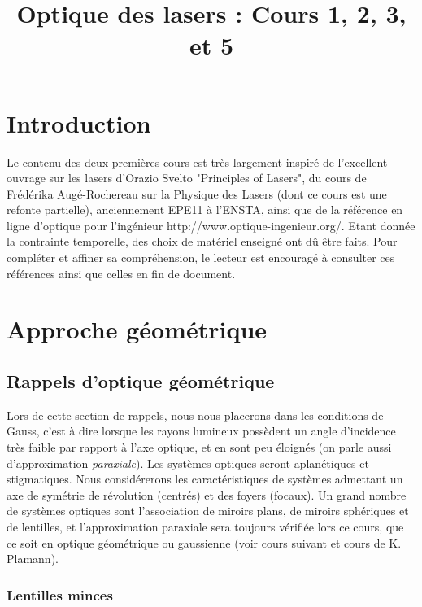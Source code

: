 \documentclass[a4paper]{book}
\title{Optique des lasers : Cours 1, 2, 3, et 5}
\author{}
\date{}
\begin{document}
\maketitle

\chapter*{Introduction}

Le contenu des deux premières  cours est très largement inspiré de l'excellent ouvrage sur les lasers d'Orazio Svelto "Principles of Lasers", du cours de Frédérika Augé-Rochereau sur la Physique des Lasers (dont ce cours est une refonte partielle), anciennement EPE11 à l'ENSTA, ainsi que de la référence en ligne d'optique pour l'ingénieur http://www.optique-ingenieur.org/. Etant donnée la contrainte temporelle, des choix de matériel enseigné ont dû être faits. Pour compléter et affiner sa compréhension, le lecteur est encouragé à consulter ces références ainsi que celles en fin de document.


\chapter{Approche géométrique}

\section{Rappels d'optique géométrique}
Lors de cette section de rappels, nous nous placerons dans les conditions de Gauss, c'est à dire lorsque les rayons lumineux possèdent un angle d'incidence très faible par rapport à l'axe optique, et en sont peu éloignés (on parle aussi d'approximation \textit{paraxiale}). Les systèmes optiques seront aplanétiques et stigmatiques. Nous considérerons les caractéristiques de systèmes admettant un axe de symétrie de révolution (centrés) et des foyers (focaux). Un grand nombre de systèmes optiques sont l’association de miroirs plans, de miroirs sphériques et de lentilles, et l'approximation paraxiale sera toujours vérifiée lors ce cours, que ce soit en optique géométrique ou gaussienne (voir cours suivant et cours de K. Plamann). 

\subsection{Lentilles minces}
\end{document}
